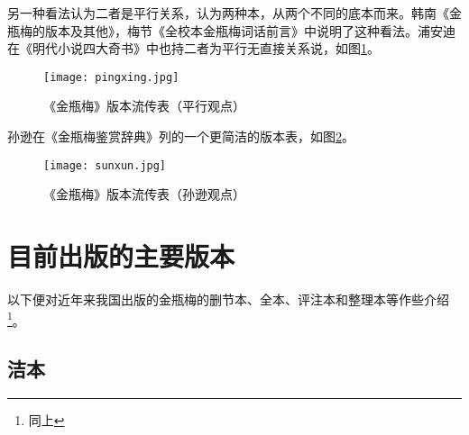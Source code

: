 另一种看法认为二者是平行关系，认为两种本，从两个不同的底本而来。韩南《金瓶梅的版本及其他》，梅节《全校本金瓶梅词话前言》中说明了这种看法。浦安迪在《明代小说四大奇书》中也持二者为平行无直接关系说，如图\ref{fig:pingxing}。
\begin{figure}[htpb]
\centering
\texttt{[image: pingxing.jpg]}
\caption{《金瓶梅》版本流传表（平行观点）}
\label{fig:pingxing}
\end{figure}

孙逊在《金瓶梅鉴赏辞典》列的一个更简洁的版本表，如图\ref{fig:sunxun}。
\begin{figure}[htpb]
\centering
\texttt{[image: sunxun.jpg]}
\caption{《金瓶梅》版本流传表（孙逊观点）}
\label{fig:sunxun}
\end{figure}


\section{目前出版的主要版本}
以下便对近年来我国出版的金瓶梅的删节本、全本、评注本和整理本等作些介绍\footnote{同上}。

\subsection{洁本}

